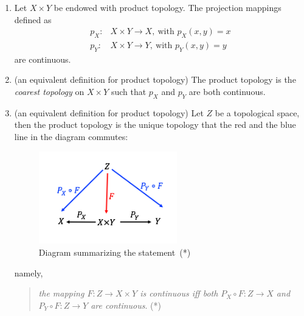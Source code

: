 \begin{proposition}
\begin{enumerate}
\item
Let $X\times Y$ be endowed with product topology. 
The projection mappings defined as
\begin{align*}
p_X:&X\times Y\to X,\ \text{with }p_X(x,y) = x\\
p_Y:&X\times Y\to Y,\ \text{with }p_Y(x,y)=y
\end{align*}
are continuous.
\item
(an equivalent definition for product topology)
The product topology is the \emph{coarest topology} on $X\times Y$ such that $p_X$ and $p_Y$ are both continuous.
\item
(an equivalent definition for product topology)
Let $Z$ be a topological space, then the product topology is the unique topology that the red and the blue line in the diagram commutes:
\begin{figure}[H]
\centering
\includegraphics[width=6cm]{week3/p_3}
\caption{Diagram summarizing the statement~(*)}
\end{figure}
namely,
\begin{quotation}
\textit{
the mapping $F:Z\to X\times Y$ is continuous iff both $P_X\circ F:Z\to X$ and $P_Y\circ F:Z\to Y$ are continuous}. (*)
\end{quotation}
\end{enumerate}
\end{proposition}
